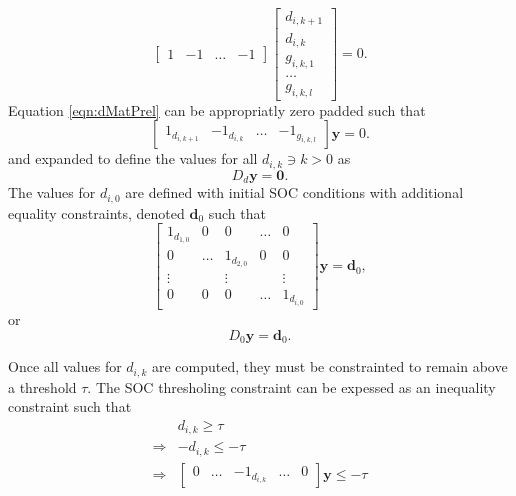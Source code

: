 \begin{equation}\label{eqn:dMatPrel}
	\begin{bmatrix}
		1 & -1 & \hdots & -1
	\end{bmatrix}
	\begin{bmatrix}
		d_{i,k+1} \\ d_{i,k} \\ g_{i,k,1} \\ \hdots \\ g_{i,k,l}
	\end{bmatrix} = 0.
\end{equation}
Equation \ref{eqn:dMatPrel} can be appropriatly zero padded  such that 
\begin{equation}
	\begin{bmatrix}
		1_{d_{i,k+1}} & -1_{d_{i,k}} & \hdots & -1_{g_{i,k,l}}
	\end{bmatrix}
	\mathbf{y} = 0.  
\end{equation}
and expanded to define the values for all $d_{i,k} \ni k > 0$ as
\begin{equation}
	D_d\mathbf{y} = \mathbf{0}.
\end{equation}
The values for $d_{i,0}$ are defined with initial SOC conditions with additional equality constraints, denoted $\mathbf{d}_0$ such that
\begin{equation}
	\begin{bmatrix}
		1_{d_{1,0}}& 0 & 0 & \hdots & 0 \\
		0 & \hdots & 1_{d_{2,0}} & 0 & 0 \\
		\vdots  &        &    \vdots   &   & \vdots  \\
		0 & 0      & 0           & \hdots & 1_{d_{i,0}}
	\end{bmatrix}
	\mathbf{y} = \mathbf{d}_0,
\end{equation}
or 
\begin{equation}\label{eqn:dInitialFinal}
	D_0\mathbf{y} = \mathbf{d}_0.
\end{equation}
\par Once all values for $d_{i,k}$ are computed, they must be constrainted to remain above a threshold $\tau$. The SOC thresholing constraint can be expessed as an inequality constraint such that
\begin{equation}\label{eqn:tau}
	\begin{aligned}
		& d_{i,k} \ge \tau \\
		\Rightarrow & -d_{i,k} \le -\tau \\
		\Rightarrow & \begin{bmatrix}0 & \hdots & -1_{d_{i,k}}& \hdots & 0 \end{bmatrix}\mathbf{y} \le -\tau
	\end{aligned}
\end{equation}
